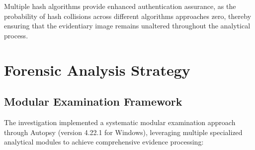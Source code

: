 Multiple hash algorithms provide enhanced authentication assurance, as the probability of hash collisions across different algorithms approaches zero, thereby ensuring that the evidentiary image remains unaltered throughout the analytical process.

\section{Forensic Analysis Strategy}

\subsection{Modular Examination Framework}
The investigation implemented a systematic modular examination approach through Autopsy (version 4.22.1 for Windows), leveraging multiple specialized analytical modules to achieve comprehensive evidence processing:


